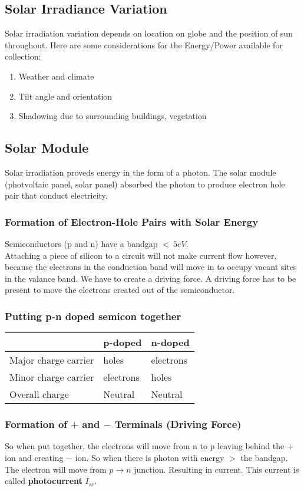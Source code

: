 \documentclass{article}
\begin{document}
\subsection{Solar Irradiance Variation}
Solar irradiation variation depends on location on globe and the position
of sun throughout.
Here are some considerations for the Energy/Power available for
collection:
\begin{enumerate}
	\item Weather and climate
	\item Tilt angle and orientation
	\item Shadowing due to surrounding buildings, vegetation
\end{enumerate}
\subsection{Solar Module}
Solar irradiation proveds energy in the form of a photon. The solar module
(photvoltaic panel, solar panel) absorbed the photon to produce electron
hole pair that conduct electricity.
\subsubsection{Formation of Electron-Hole Pairs with Solar Energy}
Semiconductors (p and n) have a bandgap $< ~5eV$. \\
Attaching a piece of silicon to a circuit will not make current flow
however, because the electrons in the conduction band will move in to
occupy vacant sites in the valance band. We have to create a driving
force. A driving force has to be present to move the electrons created
out of the semiconductor.
\subsubsection{Putting p-n doped semicon together}
\begin{center}
	\begin{tabular}[c]{l|l|l}
		\hline
		                     & p-doped   & n-doped   \\
		\hline
		Major charge carrier & holes     & electrons \\
		Minor charge carrier & electrons & holes     \\
		Overall charge       & Neutral   & Neutral   \\

		\hline
	\end{tabular}
\end{center}
\subsubsection{Formation of $+$ and $-$ Terminals (Driving Force)}
So when put together, the electrons will move from n to p leaving behind
the $+$ ion and creating $-$ ion. So when there is photon with energy $>$
the bandgap. The electron will move from $p \rightarrow n$ junction.
Resulting in current. This current is called \textbf{photocurrent} $I_{sc}$.
\end{document}

